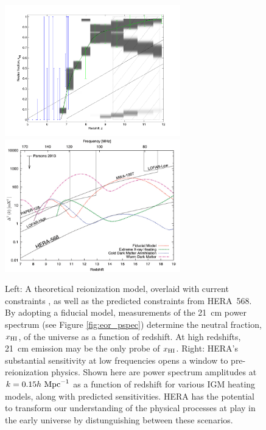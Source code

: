 \documentclass[preprint]{aastex}
\def\HI{{H{\small I }}}
\begin{document}
\begin{figure}[t]\centering
\includegraphics[width=3in]{plots/constraints.png}
~ %
\includegraphics[width=3in]{plots/Xray.pdf}
\caption{\small
Left: A theoretical reionization model, overlaid with current constraints \citep{robertson_2013},
as well as the predicted constraints from HERA~568. %
By adopting a fiducial model, measurements of the 21~cm power spectrum (see Figure \ref{fig:eor_pspec})
determine the neutral fraction, $x_{\rm\HI}$, of the universe as a function of redshift.
At high redshifts, 21~cm emission may be the only probe of $x_{\rm\HI}$.
Right: HERA's substantial sensitivity at low frequencies opens a window to
pre-reionization physics.  Shown here are power spectrum amplitudes at $k=0.15h\ {\rm Mpc}^{-1}$
as a function of redshift for various IGM heating models, along with 
predicted sensitivities.  HERA has
the potential to transform our understanding of the physical processes at play
in the early universe by distunguishing between these scenarios.
}\label{fig:x_i_Xray}
\end{figure}
\end{document}
